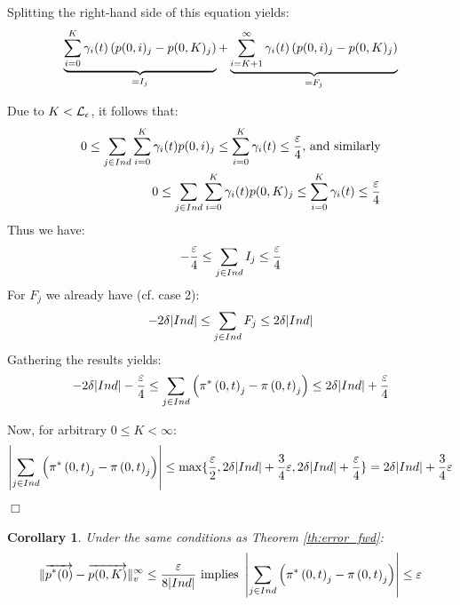 \documentclass[a4paper,11pt]{article}
\newtheorem{corollary}[theorem]{Corollary}
\newenvironment{proof}{\trivlist \item[\hskip \labelsep{\bf Proof}]}{\hfill\hbox{$\Box$}\endtrivlist}
\begin{document}
\begin{proof}
\begin{enumerate}
						Splitting the right-hand side of this equation yields:
					\begin{equation}
						\underbrace{\sum_{i=0}^{K} \gamma_{i}(t) \left( p(0,i)_{j} - p(0,K)_{j} \right)}_{=I_{j}} + \underbrace{\sum_{i=K+1}^{\infty} \gamma_{i}(t) \left( p(0,i)_{j} - p(0,K)_{j} \right)}_{=F_{j}} \nonumber
					\end{equation}

					Due to $K < \mathcal{L}_{\epsilon}$, it follows that:
					\begin{eqnarray}
						0 \leq \sum_{j \in Ind} \sum_{i=0}^{K} \gamma_{i}(t) p(0,i)_{j} \leq \sum_{i=0}^{K} \gamma_{i}(t) \leq \frac{\varepsilon}{4} \nonumber \text{, and similarly}\\
						0 \leq \sum_{j \in Ind} \sum_{i=0}^{K} \gamma_{i}(t) p(0,K)_{j} \leq \sum_{i=0}^{K} \gamma_{i}(t) \leq \frac{\varepsilon}{4} \nonumber
					\end{eqnarray}
					Thus we have:
					\begin{equation}
						-\frac{\varepsilon}{4} \leq \sum_{j \in Ind} I_{j} \leq \frac{\varepsilon}{4} \label{eq:ltp_s_2}
					\end{equation}
					For $F_{j}$ we already have (cf. case 2):
					\begin{equation}
						- 2 \delta |Ind| \leq \sum_{j \in Ind} F_{j} \leq 2 \delta |Ind| \label{eq:ltp_s_3}
					\end{equation}
					Gathering the results yields:
					\begin{equation}	
						- 2\delta |Ind| - \frac{\varepsilon}{4} \leq \sum_{j \in Ind} \left( \pi^{*} \left(0, t \right )_{j} - \pi \left(0, t \right )_{j} \right) \leq 2 \delta |Ind| + \frac{\varepsilon}{4} \nonumber
					\end{equation}
			\end{enumerate}
			Now, for arbitrary $ 0 \leq K < \infty$:
			\begin{equation}
				\left| \sum_{j \in Ind} \left( \pi^{*} \left(0, t \right )_{j} - \pi \left(0, t \right )_{j} \right) \right| \leq \max\{ \frac{\varepsilon}{2}, 2 \delta | Ind | + \frac{3}{4} \varepsilon, 2 \delta |Ind| + \frac{\varepsilon}{4} \} = 2 \delta | Ind | + \frac{3}{4} \varepsilon \nonumber
			\end{equation}
		\end{proof}
		\begin{corollary}
			Under the same conditions as Theorem \ref{th:error_fwd}: 
				\begin{equation}
					\lVert  \overrightarrow{p^{*}(0)} - \overrightarrow{p(0,K)}  \rVert_{v}^{\infty} \leq \frac{\varepsilon}{8 |Ind|} \text{ implies } \left| \sum_{j \in Ind} \left( \pi^{*} \left(0, t \right )_{j} - \pi \left(0, t \right )_{j} \right) \right| \leq \varepsilon
				\end{equation}
			\label{cl:error_fwd}
 		\end{corollary}
\end{document}
